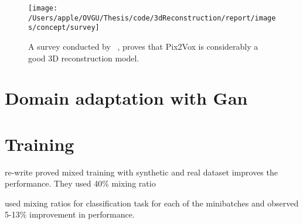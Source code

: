 \begin{figure}
    \centering
    \texttt{[image: /Users/apple/OVGU/Thesis/code/3dReconstruction/report/images/concept/survey]}
    \caption{A survey conducted by ~\cite{Han2021ImageBased3O}, proves that Pix2Vox is considerably a good 3D reconstruction model.
    }
    \label{fig:survey on 3d reconstruction}
\end{figure}

\section{Domain adaptation with Gan }

\section{Training}
\todo re-write
\cite{seib2020mixing} proved mixed training with synthetic and real dataset improves the performance. They used 40\% mixing ratio

\cite{2018LearningIC} used mixing ratios for classification task for each of the minibatches and observed 5-13\% improvement in performance.